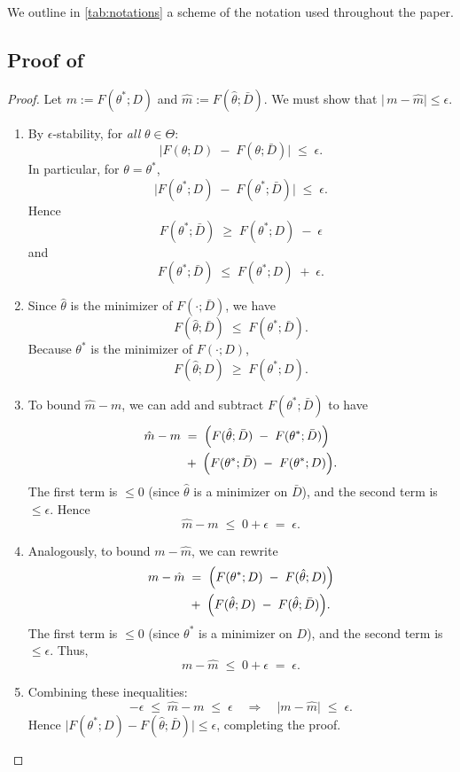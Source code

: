 We outline in \cref{tab:notations} a scheme of the notation used throughout the paper.

\subsection{Proof of }
\label{proof:thm-eps-opt-preserve}

\begin{proof}
Let \(m := F(\theta^*;D)\) and \(\hat{m} := F(\hat{\theta};\bar{D})\).  
We must show that \(\lvert\,m - \hat{m}\rvert \le \epsilon\).

\begin{enumerate}
\item 
By \(\epsilon\)-stability, for \emph{all} \(\theta\in\Theta\):
\[
  \bigl\lvert F(\theta;D) \;-\; F(\theta;\bar{D})\bigr\rvert
  \;\le\;
  \epsilon.
\]
In particular, for \(\theta = \theta^*\),
\[
  \bigl\lvert F(\theta^*;D) \;-\; F(\theta^*;\bar{D})\bigr\rvert
  \;\le\;
  \epsilon.
\]
Hence
\[
  F(\theta^*;\bar{D}) 
  \;\ge\;
  F(\theta^*;D)\;-\;\epsilon
\]
and
\[
  F(\theta^*;\bar{D}) 
  \;\le\;
  F(\theta^*;D)\;+\;\epsilon.
\]

\item 
Since \(\hat{\theta}\) is the minimizer of \(F(\cdot;\bar{D})\), we have
\[
  F(\hat{\theta};\bar{D}) 
  \;\le\; 
  F(\theta^*;\bar{D}).
\]
Because \(\theta^*\) is the minimizer of \(F(\cdot;D)\), 
\[
  F(\hat{\theta};D) 
  \;\ge\; 
  F(\theta^*;D).
\]

\item 
To bound \(\hat{m}-m\), we can add and subtract $F(\theta^*;\bar{D})$ to have
\begin{align*}
  \hat{m}-m
  &\;=\;
  \Bigl(F(\hat{\theta};\bar{D}) \;-\; F(\theta^*;\bar{D})\Bigr) \\
  &\;+\;
  \Bigl(F(\theta^*;\bar{D}) \;-\; F(\theta^*;D)\Bigr).
\end{align*}
The first term is \(\le 0\) (since \(\hat{\theta}\) is a minimizer on \(\bar{D}\)), 
and the second term is \(\le \epsilon\).  
Hence
\[
  \hat{m}-m
  \;\le\;
  0 + \epsilon
  \;=\;
  \epsilon.
\]

\item 
Analogously, to bound \(m-\hat{m}\), we can rewrite
\begin{align*}
  m-\hat{m}
  &\;=\;
  \Bigl(F(\theta^*;D) \;-\; F(\hat{\theta};D)\Bigr) \\
  &\;+\;
  \Bigl(F(\hat{\theta};D) \;-\; F(\hat{\theta};\bar{D})\Bigr).
\end{align*}
The first term is \(\le 0\) (since \(\theta^*\) is a minimizer on \(D\)), 
and the second term is \(\le \epsilon\).  
Thus,
\[
  m-\hat{m}
  \;\le\;
  0 + \epsilon
  \;=\;
  \epsilon.
\]

\item 
Combining these inequalities:
\[
  -\epsilon 
  \;\le\; 
  \hat{m}-m 
  \;\le\; 
  \epsilon
  \quad\Longrightarrow\quad
  \lvert
    m - \hat{m}
  \rvert
  \;\le\;
  \epsilon.
\]
Hence 
\(\bigl\lvert F(\theta^*;D) - F(\hat{\theta};\bar{D})\bigr\rvert\le\epsilon\), 
completing the proof.
\end{enumerate}
\end{proof}


